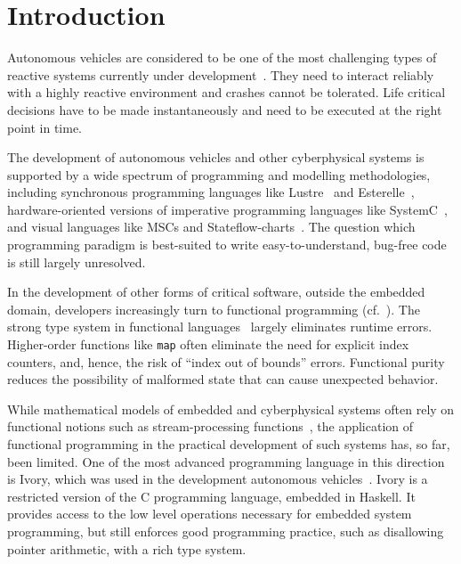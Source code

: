 \section{Introduction}

Autonomous vehicles are considered to be one of the most challenging
types of reactive systems currently under development~\cite{AlurMT16,
  WongpiromsarnKF11, RamanDSMS15}. They need to interact reliably with
a highly reactive environment and crashes cannot be tolerated.  Life
critical decisions have to be made instantaneously and need to be
executed at the right point in time.

The development of autonomous vehicles and other cyberphysical systems
is supported by a wide spectrum of
programming and modelling methodologies, 
including synchronous programming languages like Lustre~\cite{conf/popl/CaspiPHP87} 
and Esterelle~\cite{conf/concur/BerryC84},
hardware-oriented versions of imperative programming languages like
SystemC~\cite{open2006ieee}, and visual languages like MSCs and Stateflow-charts~\cite{harel2003message,journals/scp/Harel87}.
The question which programming paradigm is best-suited to write
easy-to-understand, bug-free code is still largely unresolved.

In the development of other forms of critical software, outside the
embedded domain, developers increasingly turn to functional
programming (cf.~\cite{financialsoftware}).  The strong type system in functional
languages~\cite{cardelli1996type} largely eliminates runtime errors.
Higher-order functions like \texttt{map} often eliminate the need for
explicit index counters, and, hence, the risk of ``index out of
bounds'' errors.  Functional purity reduces the possibility of
malformed state that can cause unexpected behavior.

While mathematical models of embedded and cyberphysical systems often
rely on functional notions such as stream-processing
functions~\cite{DBLP:series/mcs/BroyS01,DBLP:conf/csdm/Broy12}, the
application of functional programming in the practical development of
such systems has, so far, been limited. One of the most advanced
programming language in this direction is Ivory, which was used in the
development autonomous vehicles~\cite{pike2014}.  Ivory is a
restricted version of the C programming language, embedded in Haskell.
It provides access to the low level operations necessary for embedded
system programming, but still enforces good programming practice, such
as disallowing pointer arithmetic, with a rich type system.

